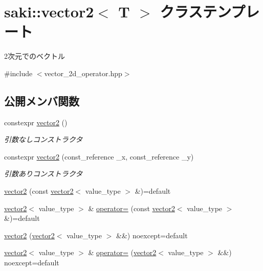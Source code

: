 \hypertarget{classsaki_1_1vector2}{}\section{saki\+:\+:vector2$<$ T $>$ クラステンプレート}
\label{classsaki_1_1vector2}


2次元でのベクトル  




{\ttfamily \#include $<$vector\+\_\+2d\+\_\+operator.\+hpp$>$}

\subsection*{公開メンバ関数}
\begin{DoxyCompactItemize}
\item 
constexpr \mbox{\hyperlink{classsaki_1_1vector2_a30a12a2e1e15cf3a41d33e7f3829aade}{vector2}} ()
\begin{DoxyCompactList}\small\item\em 引数なしコンストラクタ \end{DoxyCompactList}\item 
constexpr \mbox{\hyperlink{classsaki_1_1vector2_a28a39f7c69d7fd6393d498065cc51c00}{vector2}} (const\+\_\+reference \+\_\+x, const\+\_\+reference \+\_\+y)
\begin{DoxyCompactList}\small\item\em 引数ありコンストラクタ \end{DoxyCompactList}\item 
\mbox{\hyperlink{classsaki_1_1vector2_a10bf1b89f32e86f02e065d099d2a393c}{vector2}} (const \mbox{\hyperlink{classsaki_1_1vector2}{vector2}}$<$ value\+\_\+type $>$ \&)=default
\item 
\mbox{\hyperlink{classsaki_1_1vector2}{vector2}}$<$ value\+\_\+type $>$ \& \mbox{\hyperlink{classsaki_1_1vector2_a1eb44aa9d36eb7cae665d4c8544f5205}{operator=}} (const \mbox{\hyperlink{classsaki_1_1vector2}{vector2}}$<$ value\+\_\+type $>$ \&)=default
\item 
\mbox{\hyperlink{classsaki_1_1vector2_af19b2ba1f8433ef4feeff2cabae128d2}{vector2}} (\mbox{\hyperlink{classsaki_1_1vector2}{vector2}}$<$ value\+\_\+type $>$ \&\&) noexcept=default
\item 
\mbox{\hyperlink{classsaki_1_1vector2}{vector2}}$<$ value\+\_\+type $>$ \& \mbox{\hyperlink{classsaki_1_1vector2_affedbac760039d6968def3d5c5ed2f9f}{operator=}} (\mbox{\hyperlink{classsaki_1_1vector2}{vector2}}$<$ value\+\_\+type $>$ \&\&) noexcept=default

\end{DoxyCompactItemize}

